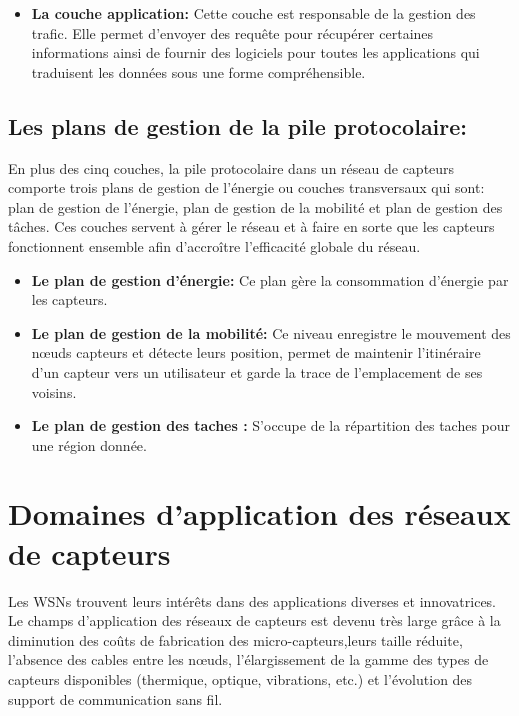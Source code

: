\begin{itemize}
	\item \textbf{La couche application: }Cette couche est responsable de la gestion des trafic. Elle permet d’envoyer des requête pour récupérer certaines informations ainsi de fournir des logiciels pour toutes les applications qui traduisent les données sous une forme compréhensible. 

\end{itemize}


\subsection{Les plans de gestion de la pile protocolaire:}
En plus des cinq couches, la pile protocolaire dans un réseau de capteurs comporte trois plans de gestion de l’énergie ou couches transversaux qui sont: plan de gestion de l’énergie, plan de gestion de la mobilité et plan de gestion des tâches. 
Ces couches servent à gérer le réseau et à faire en sorte que les capteurs fonctionnent ensemble afin d'accroître l'efficacité globale du réseau\cite{akyildiz2002wireless}.

\begin{itemize}
	\item \textbf{Le plan de gestion d’énergie: }Ce plan gère la consommation d’énergie par les capteurs.
	\item \textbf{Le plan de gestion de la mobilité: }Ce niveau enregistre le mouvement des nœuds capteurs et détecte leurs position, permet de maintenir l’itinéraire d’un capteur vers un utilisateur et garde la trace de l’emplacement de ses voisins.
	\item \textbf{Le plan de gestion des taches : }S’occupe de la répartition des taches pour une région donnée.
\end{itemize}


\section{Domaines d'application des réseaux de capteurs}
Les WSNs trouvent leurs intérêts dans des applications diverses et innovatrices. Le champs d’application des réseaux de capteurs est devenu très large grâce à la diminution des coûts de fabrication des micro-capteurs,leurs taille réduite, l’absence des cables entre les nœuds,  l'élargissement de la gamme des types de capteurs disponibles (thermique, optique, vibrations, etc.) et l'évolution des support de communication sans fil.


